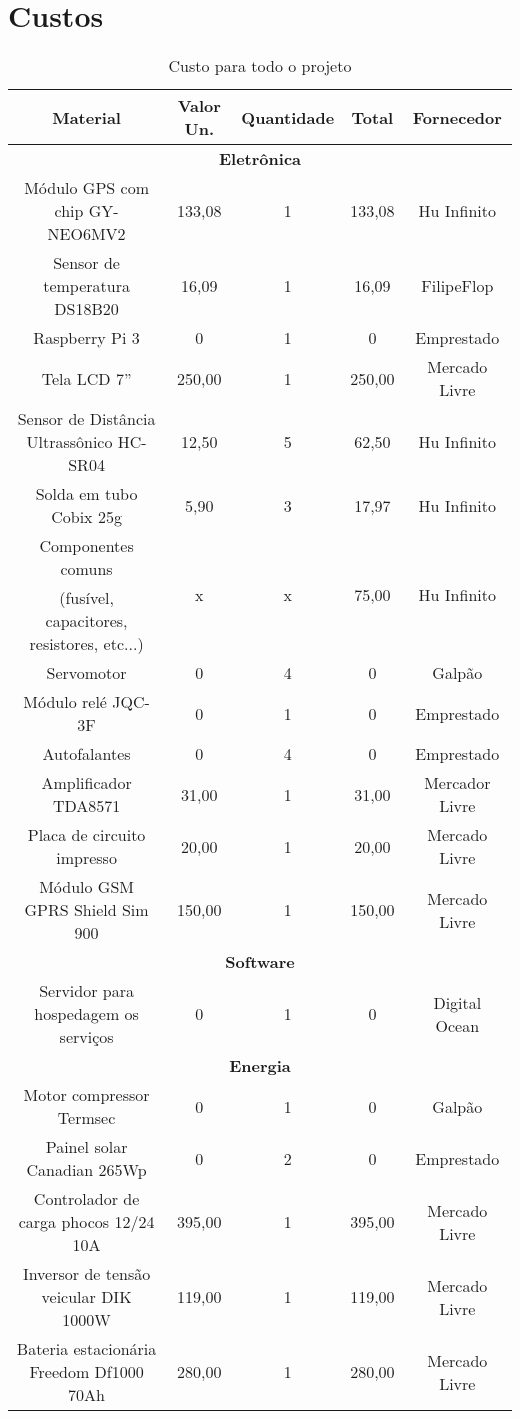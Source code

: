 \chapter{Custos}



\footnotesize  %
\setlength\LTleft{-20pt}            %
\setlength\LTright{\fill}           %
\begin{longtable}{|c|c|c|c|c|}
\caption{Custo para todo o projeto}
\label{tab:custo} 
\endfirsthead
\endhead
\hline
\textbf{Material} & \textbf{Valor Un.} & \textbf{Quantidade} & \textbf{Total} & \textbf{Fornecedor}\tabularnewline
\hline 
\multicolumn{5}{|c|}{\textbf{Eletrônica}}\tabularnewline
\hline 
Módulo GPS com chip GY-NEO6MV2 & 133,08 & 1 & 133,08 & Hu Infinito\tabularnewline
\hline 
Sensor de temperatura DS18B20 & 16,09 & 1 & 16,09 & FilipeFlop\tabularnewline
\hline 
Raspberry Pi 3 & 0 & 1 & 0 & Emprestado\tabularnewline
\hline 
Tela LCD 7'' & 250,00 & 1 & 250,00 & Mercado Livre\tabularnewline
\hline 
Sensor de Distância Ultrassônico HC-SR04 & 12,50 & 5 & 62,50 & Hu Infinito\tabularnewline
\hline 
Solda em tubo Cobix 25g & 5,90 & 3 & 17,97 & Hu Infinito\tabularnewline
\hline 
Componentes comuns  & \multirow{2}{*}{x} & \multirow{2}{*}{x} & \multirow{2}{*}{75,00} & \multirow{2}{*}{Hu Infinito}\tabularnewline
(fusível, capacitores, resistores, etc...) &  &  &  & \tabularnewline
\hline 
Servomotor & 0 & 4 & 0 & Galpão\tabularnewline
\hline 
Módulo relé JQC-3F & 0 & 1 & 0 & Emprestado\tabularnewline
\hline 
Autofalantes & 0 & 4 & 0 & Emprestado\tabularnewline
\hline 
Amplificador TDA8571 & 31,00 & 1 & 31,00 & Mercador Livre\tabularnewline
\hline 
Placa de circuito impresso & 20,00 & 1 & 20,00 & Mercado Livre\tabularnewline
\hline 
Módulo GSM GPRS Shield Sim 900 & 150,00 & 1 & 150,00 & Mercado Livre\tabularnewline
\hline 
\multicolumn{5}{|c|}{\textbf{Software}}\tabularnewline
\hline 
Servidor para hospedagem os serviços & 0 & 1 & 0 & Digital Ocean\tabularnewline
\hline 
\multicolumn{5}{|c|}{\textbf{Energia}}\tabularnewline
\hline 
Motor compressor Termsec & 0 & 1 & 0 & Galpão\tabularnewline
\hline 
Painel solar Canadian 265Wp & 0 & 2 & 0 & Emprestado\tabularnewline
\hline 
Controlador de carga phocos 12/24 10A & 395,00 & 1 & 395,00 & Mercado Livre\tabularnewline
\hline 
Inversor de tensão veicular DIK 1000W & 119,00 & 1 & 119,00 & Mercado Livre\tabularnewline
\hline 
Bateria estacionária Freedom Df1000 70Ah & 280,00 & 1 & 280,00 & Mercado Livre\tabularnewline

\end{longtable}
